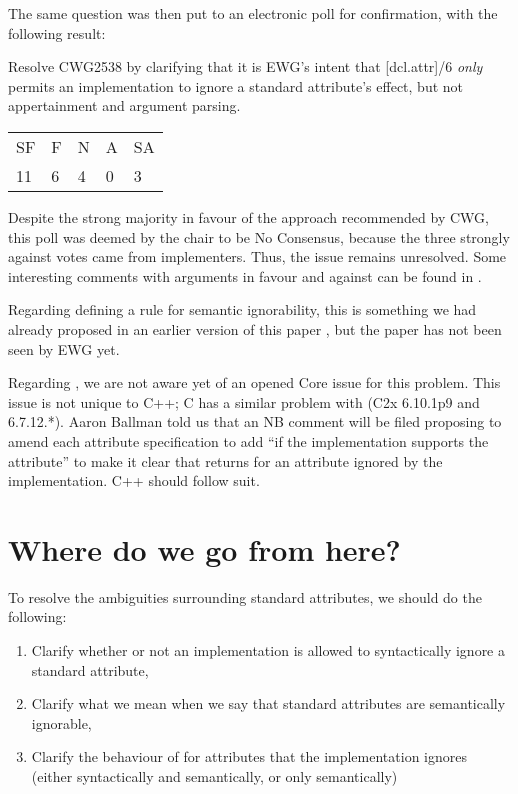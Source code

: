 The same question was then put to an electronic poll for confirmation, with the following result:

\begin{adjustwidth}{0.5cm}{0.5cm}
Resolve CWG2538 by clarifying that it is EWG’s intent that [dcl.attr]/6 \emph{only} permits an implementation to ignore a standard attribute’s effect, but not appertainment and argument parsing.

\begin{tabular}{lllll}
SF & F & N & A & SA \\
11 & 6 & 4 & 0 & 3
\end{tabular}
\end{adjustwidth}

Despite the strong majority in favour of the approach recommended by CWG, this poll was deemed by the chair to be No Consensus, because the three strongly against votes came from implementers. Thus, the issue remains unresolved. Some interesting comments with arguments in favour and against can be found in \cite{P1018R17}.

Regarding defining a rule for semantic ignorability, this is something we had already proposed in an earlier version of this paper \cite{P2552R0}, but the paper has not been seen by EWG yet.

Regarding , we are not aware yet of an opened Core issue for this problem. This issue is not unique to C++; C has a similar problem with  (C2x 6.10.1p9 and 6.7.12.*). Aaron Ballman told us that an NB comment will be filed proposing to amend each attribute specification to add ``if the implementation supports the attribute'' to make it clear that  returns  for an attribute ignored by the implementation. C++ should follow suit.

\section{Where do we go from here?}

To resolve the ambiguities surrounding standard attributes, we should do the following:

\begin{enumerate}
\item Clarify whether or not an implementation is allowed to syntactically ignore a standard attribute,
\item Clarify what we mean when we say that standard attributes are semantically ignorable,
\item Clarify the behaviour of  for attributes that the implementation ignores (either syntactically and semantically, or only semantically)
\end{enumerate}


